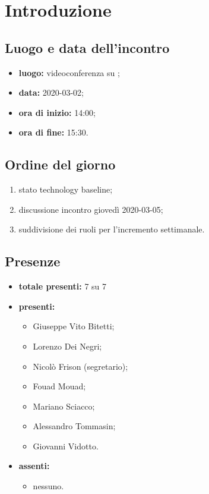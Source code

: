 \section*{Introduzione}

\subsection*{Luogo e data dell'incontro}
	\begin{itemize}
		\item \textbf{luogo:} videoconferenza su ;
		\item \textbf{data:} 2020-03-02;
		\item \textbf{ora di inizio:} 14:00;
		\item \textbf{ora di fine:} 15:30.
	\end{itemize}

\subsection*{Ordine del giorno}
	\begin{enumerate}
			\item stato technology baseline;
			\item discussione incontro giovedì 2020-03-05;
			\item suddivisione dei ruoli per l'incremento settimanale.
	\end{enumerate}

\subsection*{Presenze}
	\begin{itemize}
		\item \textbf{totale presenti:} 7 su 7
		\item \textbf{presenti: }
			\begin{itemize}
				\item Giuseppe Vito Bitetti;
				\item Lorenzo Dei Negri;
				\item Nicolò Frison (segretario);
				\item Fouad Mouad;
				\item Mariano Sciacco;
				\item Alessandro Tommasin;
				\item Giovanni Vidotto.
			\end{itemize}
		\item \textbf{assenti: }
			\begin{itemize}
				\item nessuno.
			\end{itemize}
	\end{itemize}



